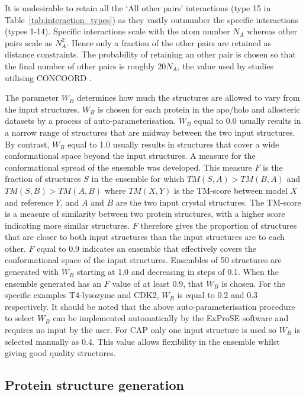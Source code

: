 It is undesirable to retain all the `All other pairs' interactions (type 15 in Table~\ref{tab:interaction_types}) as they vastly outnumber the specific interactions (types 1-14).
Specific interactions scale with the atom number $N_{A}$ whereas other pairs scale as $N_{A}^{2}$.
Hence only a fraction of the other pairs are retained as distance constraints.
The probability of retaining an other pair is chosen so that the final number of other pairs is roughly $20N_{A}$, the value used by studies utilising CONCOORD \cite{DeGroot1999}.

The parameter $W_{B}$ determines how much the structures are allowed to vary from the input structures.
$W_{B}$ is chosen for each protein in the apo/holo and allosteric datasets by a process of auto-parameterisation.
$W_{B}$ equal to 0.0 usually results in a narrow range of structures that are midway between the two input structures.
By contrast, $W_{B}$ equal to 1.0 usually results in structures that cover a wide conformational space beyond the input structures.
A measure for the conformational spread of the ensemble was developed.
This measure $F$ is the fraction of structures $S$ in the ensemble for which $TM(S,A) > TM(B,A)$ and $TM(S,B) > TM(A,B)$ where $TM(X,Y)$ is the TM-score between model $X$ and reference $Y$, and $A$ and $B$ are the two input crystal structures.
The TM-score is a measure of similarity between two protein structures, with a higher score indicating more similar structures.
$F$ therefore gives the proportion of structures that are closer to both input structures than the input structures are to each other.
$F$ equal to 0.9 indicates an ensemble that effectively covers the conformational space of the input structures.
Ensembles of 50 structures are generated with $W_{B}$ starting at 1.0 and decreasing in steps of 0.1.
When the ensemble generated has an $F$ value of at least 0.9, that $W_{B}$ is chosen.
For the specific examples T4-lysozyme and CDK2, $W_{B}$ is equal to 0.2 and 0.3 respectively.
It should be noted that the above auto-parameterisation procedure to select $W_{B}$ can be implemented automatically by the ExProSE software and requires no input by the user.
For CAP only one input structure is used so $W_{B}$ is selected manually as 0.4.
This value allows flexibility in the ensemble whilst giving good quality structures.


\subsection{Protein structure generation}

